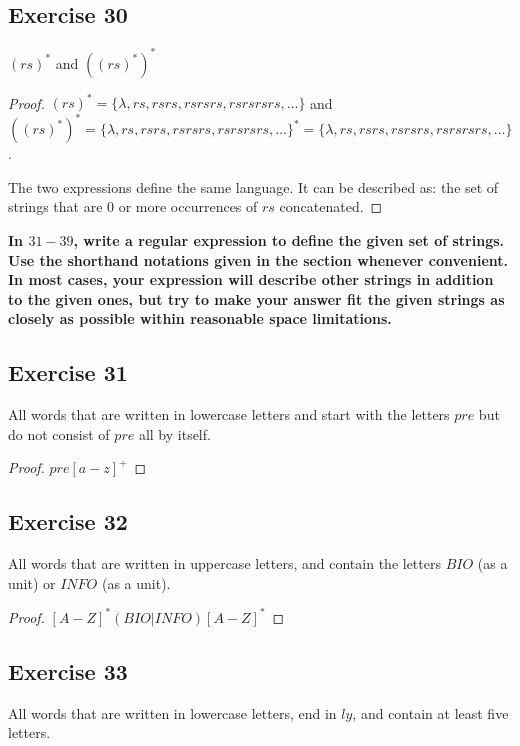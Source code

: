 \documentclass[14pt]{extarticle}
\newcommand{\cy}{\color{cyan}}
\begin{document}
\subsection{Exercise 30}
\((rs)^*\) and \(((rs)^*)^*\)

\begin{proof}
    \((rs)^* = \{\lambda, rs, rsrs, rsrsrs, rsrsrsrs, \ldots\}\) and \\
    \(((rs)^*)^* = \{\lambda, rs, rsrs, rsrsrs, rsrsrsrs, \ldots\}^* = \{\lambda, rs, rsrs, rsrsrs, rsrsrsrs, \ldots\}\).

    The two expressions define the same language. It can be described as: the set of strings that are 0 or more
    occurrences of \(rs\) concatenated.
\end{proof}

{\bf \cy In \(31-39\), write a regular expression to define the given set of strings. Use the shorthand notations given in
the section whenever convenient. In most cases, your expression will describe other strings in addition to the
given ones, but try to make your answer fit the given strings as closely as possible within reasonable space limitations.}

\subsection{Exercise 31}
All words that are written in lowercase letters and start with the letters \(pre\) but do not consist of \(pre\) all by
itself.

\begin{proof}
    \(pre[a - z]^+\)
\end{proof}

\subsection{Exercise 32}
All words that are written in uppercase letters, and contain the letters \(BIO\) (as a unit) or \(INFO\) (as a unit).

\begin{proof}
    \([A-Z]^*(BIO | INFO)[A-Z]^*\)
\end{proof}

\subsection{Exercise 33}
All words that are written in lowercase letters, end in \(ly\), and contain at least five letters.
\end{document}
